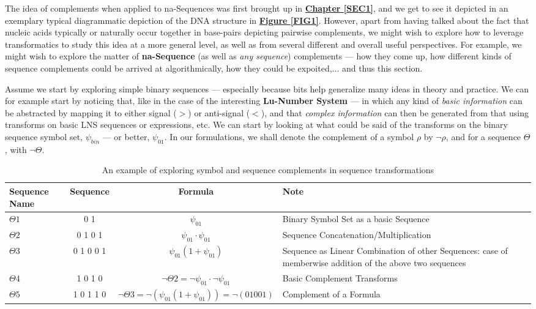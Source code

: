 \documentclass[a4paper, 18pt]{book} %
\begin{document}
The idea of complements when applied to na-Sequences was first brought up in \textbf{\hyperref[SEC1]{Chapter \ref{SEC1}}}, and we get to see it depicted in an exemplary typical diagrammatic depiction of the DNA structure in \textbf{\hyperref[FIG1]{Figure \ref{FIG1}}}. However, apart from having talked about the fact that nucleic acids typically or naturally occur together in base-pairs depicting pairwise complements, we might wish to explore how to leverage transformatics to study this idea at a more general level, as well as from several different and overall useful perspectives. For example, we might wish to explore the matter of \textbf{na-Sequence} (as well as \textit{any sequence}) complements --- how they come up, how different kinds of sequence complements could be arrived at algorithmically, how they could be expoited,... and thus this section.

Assume we start by exploring simple binary sequences --- especially because bits help generalize many ideas in theory and practice. We can for example start by noticing that, like in the case of the interesting \textbf{Lu-Number System}\cite{lnspaper} --- in which any kind of \textit{basic information} can be abstracted by mapping it to either signal ($>$) or anti-signal ($<$), and that \textit{complex information} can then be generated from that using transforms on basic LNS sequences or expressions, etc. We can start by looking at what could be said of the transforms on the binary sequence symbol set, $\psi_{bin}$ --- or better, $\psi_{01}$. In our formulations, we shall denote the complement of a symbol $\rho$ by $\lnot\rho$, and for a sequence $\Theta$, with $\lnot\Theta$.


\begin{table}[H]
  \centering
  \Large
	\begin{tabular}[t]{|p{2cm}|c|c|p{4cm}|}
	\hline
	Sequence Name & Sequence & Formula & Note\\
	\hline
	\hline
	$\Theta1$ & 0 1 & $\psi_{01}$ & Binary Symbol Set as a basic Sequence\\
	\hline
	$\Theta2$ & 0 1 0 1 & $\psi_{01}\cdot\psi_{01}$ & Sequence Concatenation/Multiplication\\
	\hline
	$\Theta3$ & 0 1 0 0 1 & $\psi_{01}(1 + \psi_{01})$ & Sequence as Linear Combination of other Sequences: case of memberwise addition of the above two sequences\\
	\hline
	$\Theta4$ & 1 0 1 0 & $\lnot\Theta2 = \lnot\psi_{01} \cdot \lnot\psi_{01}$ & Basic Complement Transforms\\
	\hline

	$\Theta5$ & 1 0 1 1 0 & $\lnot\Theta3 = \lnot(\psi_{01}(1 + \psi_{01})) = \lnot(0 1 0 0 1)$ & Complement of a Formula\\
		\hline
	              
\end{tabular}
 \caption{An example of exploring symbol and sequence complements in sequence transformations}
  \label{TABCOMPLEMENTS}
\end{table}
\end{document}
